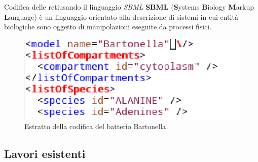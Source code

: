 \documentclass{beamer}
\begin{document}
\begin{frame}{Codifica delle reti}{usando il linguaggio \emph{SBML}}
  \textbf{SBML} (\textbf{S}ystems \textbf{B}iology \textbf{M}arkup
  \textbf{L}anguage) \`e un linguaggio orientato alla descrizione di
  sistemi in cui entit\`a biologiche sono oggetto di manipolazioni
  eseguite da processi fisici.
  \begin{figure}
    \includegraphics[scale=.6]{images/sbml-code-chunk.eps}
    \caption{Estratto della codifica del batterio Bartonella}
  \end{figure}
\end{frame}



\subsection{Lavori esistenti}
\end{document}
